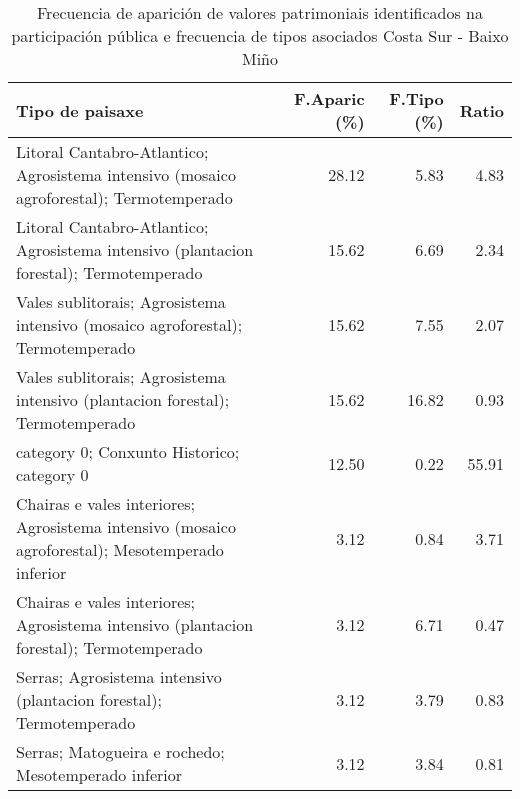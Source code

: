 \begin{table}[p]
\centering
\caption{Frecuencia de aparición de valores patrimoniais identificados na participación pública e frecuencia de tipos asociados Costa Sur - Baixo Miño} 
\label{vsixotpat3}
\begin{tabular}{lrrr}
  \hline
Tipo de paisaxe & F.Aparic (\%) & F.Tipo (\%) & Ratio \\ 
  \hline
Litoral Cantabro-Atlantico; Agrosistema intensivo (mosaico agroforestal); Termotemperado & 28.12 & 5.83 & 4.83 \\ 
  Litoral Cantabro-Atlantico; Agrosistema intensivo (plantacion forestal); Termotemperado & 15.62 & 6.69 & 2.34 \\ 
  Vales sublitorais; Agrosistema intensivo (mosaico agroforestal); Termotemperado & 15.62 & 7.55 & 2.07 \\ 
  Vales sublitorais; Agrosistema intensivo (plantacion forestal); Termotemperado & 15.62 & 16.82 & 0.93 \\ 
  category 0; Conxunto Historico; category 0 & 12.50 & 0.22 & 55.91 \\ 
  Chairas e vales interiores; Agrosistema intensivo (mosaico agroforestal); Mesotemperado inferior & 3.12 & 0.84 & 3.71 \\ 
  Chairas e vales interiores; Agrosistema intensivo (plantacion forestal); Termotemperado & 3.12 & 6.71 & 0.47 \\ 
  Serras; Agrosistema intensivo (plantacion forestal); Termotemperado & 3.12 & 3.79 & 0.83 \\ 
  Serras; Matogueira e rochedo; Mesotemperado inferior & 3.12 & 3.84 & 0.81 \\ 
   \hline
\end{tabular}
\end{table}
